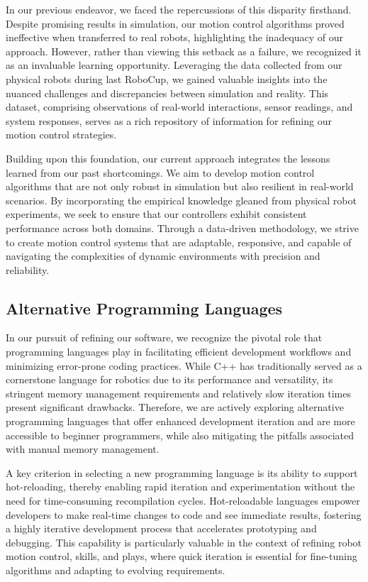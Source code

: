\documentclass[runningheads]{llncs}
\begin{document}
In our previous endeavor, we faced the repercussions of this disparity firsthand. Despite promising results in simulation, our motion control algorithms proved ineffective when transferred to real robots, highlighting the inadequacy of our approach. However, rather than viewing this setback as a failure, we recognized it as an invaluable learning opportunity. Leveraging the data collected from our physical robots during last RoboCup, we gained valuable insights into the nuanced challenges and discrepancies between simulation and reality. This dataset, comprising observations of real-world interactions, sensor readings, and system responses, serves as a rich repository of information for refining our motion control strategies.

Building upon this foundation, our current approach integrates the lessons learned from our past shortcomings. We aim to develop motion control algorithms that are not only robust in simulation but also resilient in real-world scenarios. By incorporating the empirical knowledge gleaned from physical robot experiments, we seek to ensure that our controllers exhibit consistent performance across both domains. Through a data-driven methodology, we strive to create motion control systems that are adaptable, responsive, and capable of navigating the complexities of dynamic environments with precision and reliability.

\subsection{Alternative Programming Languages}
In our pursuit of refining our software, we recognize the pivotal role that programming languages play in facilitating efficient development workflows and minimizing error-prone coding practices. While C++ has traditionally served as a cornerstone language for robotics due to its performance and versatility, its stringent memory management requirements and relatively slow iteration times present significant drawbacks. Therefore, we are actively exploring alternative programming languages that offer enhanced development iteration and are more accessible to beginner programmers, while also mitigating the pitfalls associated with manual memory management.

A key criterion in selecting a new programming language is its ability to support hot-reloading, thereby enabling rapid iteration and experimentation without the need for time-consuming recompilation cycles. Hot-reloadable languages empower developers to make real-time changes to code and see immediate results, fostering a highly iterative development process that accelerates prototyping and debugging. This capability is particularly valuable in the context of refining robot motion control, skills, and plays, where quick iteration is essential for fine-tuning algorithms and adapting to evolving requirements.
\end{document}
